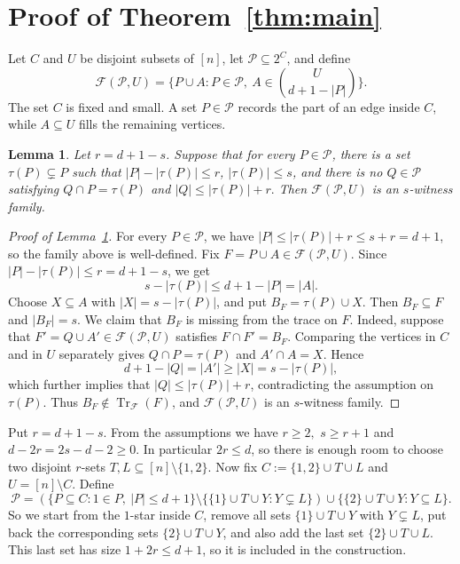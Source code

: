 \documentclass[11pt]{article}
\newtheorem{lemma}[theorem]{Lemma}
\theoremstyle{definition}
\newcommand{\cP}{\mathcal{P}}
\newcommand{\cF}{\mathcal{F}}
\newcommand{\Tr}{\operatorname{Tr}}
\begin{document}
\section{Proof of Theorem~\ref{thm:main}}

Let \(C\) and \(U\) be disjoint subsets of \([n]\), let \(\cP\subseteq 2^C\), and define
\[
\cF(\cP,U)=\bigg\{P\cup A:P\in\cP,\ A\in\binom{U}{d+1-|P|}\bigg\}.
\]
The set \(C\) is fixed and small. A set \(P\in\cP\) records the part of an edge inside \(C\), while \(A\subseteq U\) fills the remaining vertices.

\begin{lemma}\label{lem:criterion}
Let \(r=d+1-s\). Suppose that for every \(P\in\cP\), there is a set \(\tau(P)\subsetneq P\) such that \(|P|-|\tau(P)|\le r\), \(|\tau(P)|\le s\), and there is no \(Q\in\cP\) satisfying
\(
Q\cap P=\tau(P)\) and \(|Q|\le |\tau(P)|+r.\)
Then \(\cF(\cP,U)\) is an \(s\)-witness family.
\end{lemma}

\begin{proof}[Proof of Lemma~\ref{lem:criterion}]
For every \(P\in\cP\), we have \(|P|\le |\tau(P)|+r\le s+r=d+1\), so the family above is well-defined. Fix \(F=P\cup A\in\cF(\cP,U)\). Since \(|P|-|\tau(P)|\le r=d+1-s\), we get
\[
s-|\tau(P)|\le d+1-|P|=|A|.
\]
Choose \(X\subseteq A\) with \(|X|=s-|\tau(P)|\), and put \(B_F=\tau(P)\cup X\). Then \(B_F\subseteq F\) and \(|B_F|=s\). We claim that \(B_F\) is missing from the trace on \(F\). Indeed, suppose that \(F'=Q\cup A'\in\cF(\cP,U)\) satisfies \(F\cap F'=B_F\). Comparing the vertices in \(C\) and in \(U\) separately gives
\(Q\cap P=\tau(P)\) and \(A'\cap A=X.\)
Hence
\[
d+1-|Q|=|A'|\ge |X|=s-|\tau(P)|,
\]
which further implies that \(|Q|\le |\tau(P)|+r\), contradicting the assumption on \(\tau(P)\). Thus \(B_F\notin\Tr_{\cF}(F)\), and \(\cF(\cP,U)\) is an \(s\)-witness family.
\end{proof}

Put \(r=d+1-s\). From the assumptions we have
\(r\ge2,\) \(s\ge r+1\) and \(d-2r=2s-d-2\ge 0.\)
In particular \(2r\le d\), so there is enough room to choose two disjoint \(r\)-sets \(T,L\subseteq[n]\setminus\{1,2\}\). Now fix
\(
C:=\{1,2\}\cup T\cup L\) and \(U=[n]\setminus C.\)
Define
\[
\cP=\left(\{P\subseteq C:1\in P,\ |P|\le d+1\}\setminus\{\{1\}\cup T\cup Y:Y\subsetneq L\}\right)\cup\{\{2\}\cup T\cup Y:Y\subseteq L\}.
\]
So we start from the \(1\)-star inside \(C\), remove all sets \(\{1\}\cup T\cup Y\) with \(Y\subsetneq L\), put back the corresponding sets \(\{2\}\cup T\cup Y\), and also add the last set \(\{2\}\cup T\cup L\). This last set has size \(1+2r\le d+1\), so it is included in the construction.
\end{document}

